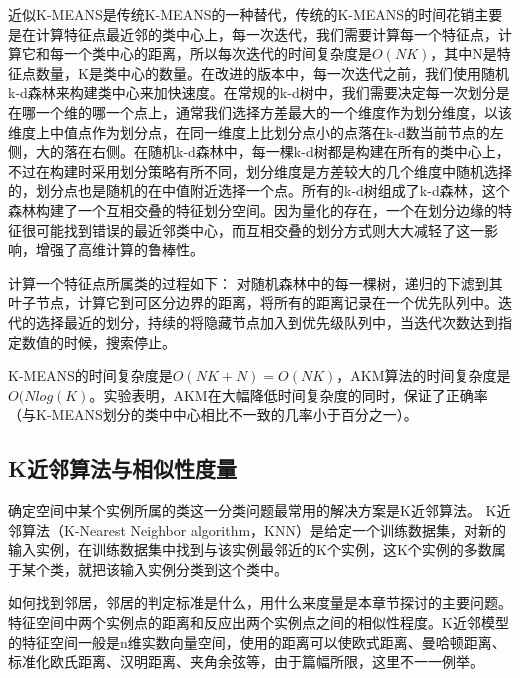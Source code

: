 近似K-MEANS是传统K-MEANS的一种替代，传统的K-MEANS的时间花销主要是在计算特征点最近邻的类中心上，每一次迭代，我们需要计算每一个特征点，计算它和每一个类中心的距离，所以每次迭代的时间复杂度是\(O(NK)\)，其中N是特征点数量，K是类中心的数量。在改进的版本中，每一次迭代之前，我们使用随机k-d森林来构建类中心来加快速度。在常规的k-d树中，我们需要决定每一次划分是在哪一个维的哪一个点上，通常我们选择方差最大的一个维度作为划分维度，以该维度上中值点作为划分点，在同一维度上比划分点小的点落在k-d数当前节点的左侧，大的落在右侧。在随机k-d森林中，每一棵k-d树都是构建在所有的类中心上，不过在构建时采用划分策略有所不同，划分维度是方差较大的几个维度中随机选择的，划分点也是随机的在中值附近选择一个点。所有的k-d树组成了k-d森林，这个森林构建了一个互相交叠的特征划分空间。因为量化的存在，一个在划分边缘的特征很可能找到错误的最近邻类中心，而互相交叠的划分方式则大大减轻了这一影响，增强了高维计算的鲁棒性。

计算一个特征点所属类的过程如下：
对随机森林中的每一棵树，递归的下滤到其叶子节点，计算它到可区分边界的距离，将所有的距离记录在一个优先队列中。迭代的选择最近的划分，持续的将隐藏节点加入到优先级队列中，当迭代次数达到指定数值的时候，搜索停止。

K-MEANS的时间复杂度是\(O(NK+N) = O(NK)\)，AKM算法的时间复杂度是\(O(Nlog(K)\)。实验表明，AKM在大幅降低时间复杂度的同时，保证了正确率（与K-MEANS划分的类中中心相比不一致的几率小于百分之一）。


\subsection{K近邻算法与相似性度量}
确定空间中某个实例所属的类这一分类问题最常用的解决方案是K近邻算法。
K近邻算法（K-Nearest Neighbor algorithm，KNN）是给定一个训练数据集，对新的输入实例，在训练数据集中找到与该实例最邻近的K个实例，这K个实例的多数属于某个类，就把该输入实例分类到这个类中。

如何找到邻居，邻居的判定标准是什么，用什么来度量是本章节探讨的主要问题。特征空间中两个实例点的距离和反应出两个实例点之间的相似性程度。K近邻模型的特征空间一般是n维实数向量空间，使用的距离可以使欧式距离、曼哈顿距离、标准化欧氏距离、汉明距离、夹角余弦等，由于篇幅所限，这里不一一例举。


